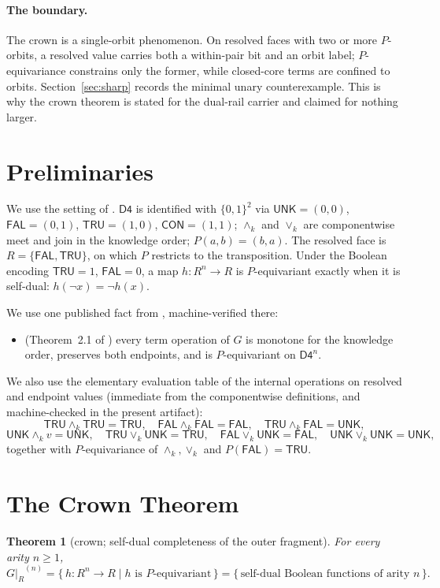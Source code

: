 \documentclass[11pt]{article}
\newtheorem{theorem}{Theorem}[section]
\theoremstyle{remark}
\newcommand{\Dfour}{\ensuremath{\mathsf{D4}}}
\newcommand{\UNK}{\ensuremath{\mathsf{UNK}}}
\newcommand{\FAL}{\ensuremath{\mathsf{FAL}}}
\newcommand{\TRU}{\ensuremath{\mathsf{TRU}}}
\newcommand{\CON}{\ensuremath{\mathsf{CON}}}
\newcommand{\meetk}{\ensuremath{\wedge_k}}
\newcommand{\joink}{\ensuremath{\vee_k}}
\newcommand{\GR}{\ensuremath{G|_R}}
\begin{document}
\paragraph{The boundary.} The crown is a single-orbit phenomenon. On
resolved faces with two or more $P$-orbits, a resolved value carries both
a within-pair bit and an orbit label; $P$-equivariance constrains only
the former, while closed-core terms are confined to orbits.
Section~\ref{sec:sharp} records the minimal unary counterexample. This is
why the crown theorem is stated for the dual-rail carrier and claimed for
nothing larger.

\section{Preliminaries}

We use the setting of \cite[\S2]{wcy2}. $\Dfour$ is identified with
$\{0,1\}^2$ via $\UNK=(0,0)$, $\FAL=(0,1)$, $\TRU=(1,0)$, $\CON=(1,1)$;
$\meetk$ and $\joink$ are componentwise meet and join in the knowledge
order; $P(a,b)=(b,a)$. The resolved face is $R=\{\FAL,\TRU\}$, on which
$P$ restricts to the transposition. Under the Boolean encoding $\TRU=1$,
$\FAL=0$, a map $h:R^n\to R$ is $P$-equivariant exactly when it is
self-dual: $h(\neg x)=\neg h(x)$.

We use one published fact from \cite{wcy2}, machine-verified there:

\begin{itemize}
\item[\textbf{(E)}] (Theorem~2.1 of \cite{wcy2}) every term operation of
$G$ is monotone for the knowledge order, preserves both endpoints, and is
$P$-equivariant on $\Dfour^n$.
\end{itemize}

We also use the elementary evaluation table of the internal operations on
resolved and endpoint values (immediate from the componentwise
definitions, and machine-checked in the present artifact):
\[
\TRU\meetk\TRU=\TRU,\quad \FAL\meetk\FAL=\FAL,\quad \TRU\meetk\FAL=\UNK,
\]
\[
\UNK\meetk v=\UNK,\quad \TRU\joink\UNK=\TRU,\quad \FAL\joink\UNK=\FAL,
\quad \UNK\joink\UNK=\UNK,
\]
together with $P$-equivariance of $\meetk,\joink$ and $P(\FAL)=\TRU$.

\section{The Crown Theorem}

\begin{theorem}[crown; self-dual completeness of the outer fragment]
\label{thm:crown}
For every arity $n\ge 1$,
\[
\GR^{(n)} = \{\, h:R^n\to R \mid h \text{ is } P\text{-equivariant} \,\}
= \{\, \text{self-dual Boolean functions of arity } n \,\}.
\]
\end{theorem}
\end{document}
